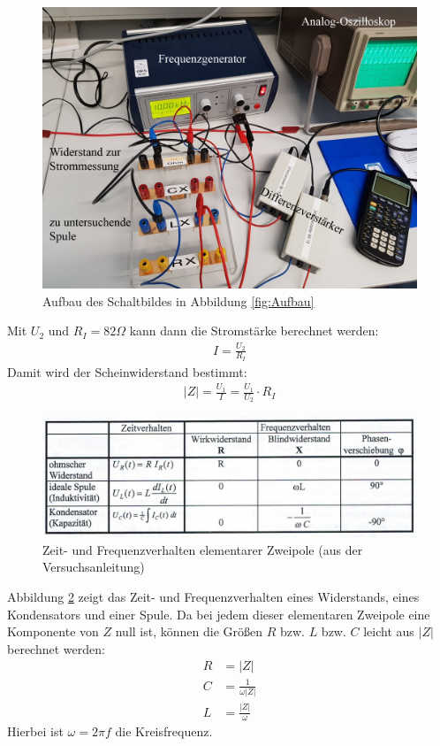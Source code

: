 \documentclass{scrartcl}
\begin{document}
\begin{figure}[H]
  \centering
    \includegraphics[scale=0.45]{Aufbau_Foto.JPG}
  \caption{Aufbau des Schaltbildes in Abbildung \ref{fig:Aufbau}}
  \label{fig:Aufbau_Foto}
\end{figure}
Mit $U_{2}$ und $R_{I} = 82 \Omega$ kann dann die Stromstärke berechnet werden:
\begin{align}
I = \frac{U_{2}}{R_{I}}
\end{align}
Damit wird der Scheinwiderstand bestimmt:
\begin{align}
|Z| = \frac{U_{1}}{I} = \frac{U_{1}}{U_{2}} \cdot R_{I}
\end{align}

\begin{figure}[H]
  \centering
    \includegraphics[scale=0.75]{Tabelle.PNG}
  \caption{Zeit- und Frequenzverhalten elementarer Zweipole (aus der Versuchsanleitung)}
  \label{fig:Tabelle}
\end{figure}
Abbildung \ref{fig:Tabelle} zeigt das Zeit- und Frequenzverhalten eines Widerstands, eines Kondensators und einer Spule. Da bei jedem dieser elementaren Zweipole eine Komponente von $Z$ null ist, können die Größen $R$ bzw. $L$ bzw. $C$ leicht aus $|Z|$ berechnet werden:
\begin{align}
R &= |Z| \\
C &= \frac{1}{\omega |Z|} \\
L &= \frac{|Z|}{\omega}
\end{align}
Hierbei ist $\omega = 2 \pi f$ die Kreisfrequenz.
\end{document}
